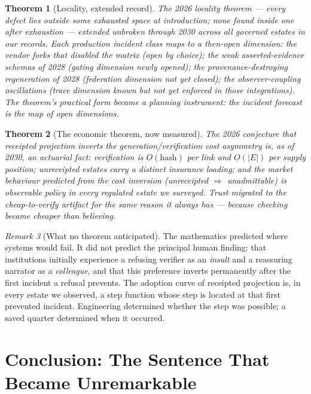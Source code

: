 \documentclass[11pt,a4paper]{report}
\newtheorem{theorem}{Theorem}[chapter]
\theoremstyle{definition}
\theoremstyle{remark}
\newtheorem{remark}[theorem]{Remark}
\begin{document}
\begin{theorem}[Locality, extended record]
The 2026 locality theorem --- every defect lies outside some exhausted
space at introduction; none found inside one after exhaustion --- extended
unbroken through 2030 across all governed estates in our records. Each
production incident class maps to a then-open dimension: the vendor forks
that disabled the matrix (open by choice); the weak asserted-evidence
schemas of 2028 (gating dimension newly opened); the provenance-destroying
regeneration of 2028 (federation dimension not yet closed); the
observer-coupling oscillations (trace dimension known but not yet enforced
in those integrations). The theorem's practical form became a planning
instrument: the incident forecast \emph{is} the map of open dimensions.
\end{theorem}

\begin{theorem}[The economic theorem, now measured]
The 2026 conjecture that receipted projection inverts the
generation/verification cost asymmetry is, as of 2030, an actuarial fact:
verification is $O(\mathrm{hash})$ per link and $O(|E|)$ per supply
position; unreceipted estates carry a distinct insurance loading; and the
market behaviour predicted from the cost inversion (unreceipted
$\Rightarrow$ unadmittable) is observable policy in every regulated estate
we surveyed. Trust migrated to the cheap-to-verify artifact for the same
reason it always has --- because checking became cheaper than believing.
\end{theorem}

\begin{remark}[What no theorem anticipated]
The mathematics predicted where systems would fail. It did not predict the
principal human finding: that institutions initially experience a refusing
verifier as an \emph{insult} and a reassuring narrator as a
\emph{colleague}, and that this preference inverts permanently after the
first incident a refusal prevents. The adoption curve of receipted
projection is, in every estate we observed, a step function whose step is
located at that first prevented incident. Engineering determined whether
the step was possible; a saved quarter determined when it occurred.
\end{remark}

\chapter{Conclusion: The Sentence That Became Unremarkable}
\end{document}
